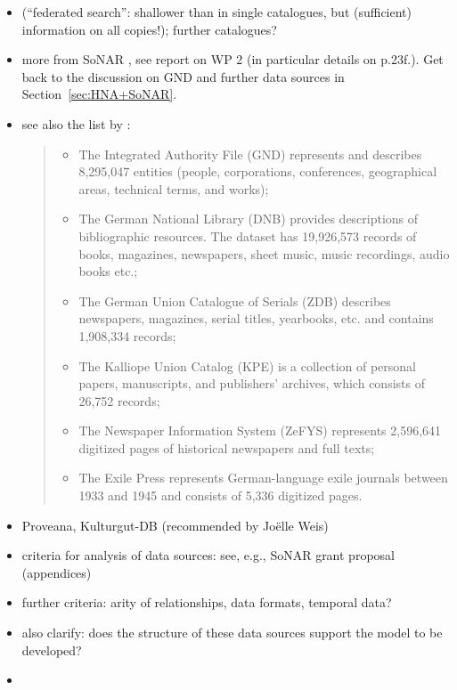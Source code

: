 \begin{itemize}
  \item
     (\enquote{federated search}: shallower than in single catalogues,
    but (sufficient) information on all copies!);
    further catalogues?
  \item
    more from \gls{SoNAR} , see report on WP 2 (in particular details on p.23f.).
    Get back to the discussion on \gls{GND} and further data sources in Section~\ref{sec:HNA+SoNAR}.
  \item
    see also the list by \autocite{Menzel2020}:

    \blockquote{%
      \begin{itemize}
        \item
          The Integrated Authority File (GND) represents and describes 8,295,047 entities (people, corporations, conferences, geographical areas, technical terms, and works);
        \item
          The German National Library (DNB) provides descriptions of bibliographic resources. The dataset has 19,926,573 records of books, magazines, newspapers, sheet music, music recordings, audio books etc.;
        \item
          The German Union Catalogue of Serials (ZDB) describes newspapers, magazines, serial titles, yearbooks, etc. and contains 1,908,334 records;
        \item
          The Kalliope Union Catalog (KPE) is a collection of personal papers, manuscripts, and publishers’ archives, which consists of 26,752 records;
        \item
          The Newspaper Information System (ZeFYS) represents 2,596,641 digitized pages of historical newspapers and full texts;
        \item
          The Exile Press represents German-language exile journals between 1933 and 1945 and consists of 5,336 digitized pages.
      \end{itemize}
    }
  \item
    Proveana, Kulturgut-DB (recommended by Jo\"elle Weis)
  \item 
    criteria for analysis of data sources: see, e.g., \gls{SoNAR} grant proposal (appendices) 
  \item
    further criteria: arity of relationships, data formats, temporal data?
  \item
    also clarify: does the structure of these data sources support the model to be developed?
  \item

\end{itemize}
